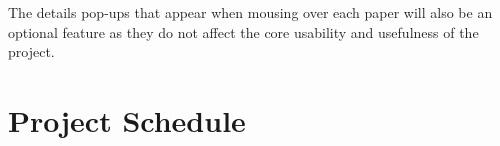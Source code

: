 \documentclass[dvips,12pt]{article}
\begin{document}
The details pop-ups that appear when mousing over each paper will also be an optional feature as they do not affect the core usability and usefulness of the project.

\section{Project Schedule}

\end{document}
